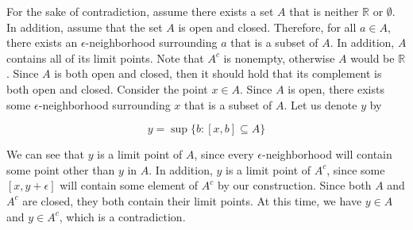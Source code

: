 \documentclass[12pt, letterpaper, twoside]{article}
\begin{document}
For the sake of contradiction, assume there exists a set $A$ that is neither $\mathbb{R}$ or $\emptyset$. In addition, assume that the set $A$ is open and closed. Therefore, for all $a \in A$, there exists an $\epsilon$-neighborhood surrounding $a$ that is a subset of $A$. In addition, $A$ contains all of its limit points. Note that $A^c$ is nonempty, otherwise $A$ would be $\mathbb{R}$. Since $A$ is both open and closed, then it should hold that its complement is both open and closed. Consider the point $x \in A$. Since $A$ is open, there exists some $\epsilon$-neighborhood surrounding $x$ that is a subset of $A$. Let us denote $y$ by 

\begin{equation*}
    y = \sup \{b \colon [x, b] \subseteq A \}
\end{equation*}

We can see that $y$ is a limit point of $A$, since every $\epsilon$-neighborhood will contain some point other than $y$ in $A$. In addition, $y$ is a limit point of $A^c$, since some $[x, y + \epsilon]$ will contain some element of $A^c$ by our construction. Since both $A$ and $A^c$ are closed, they both contain their limit points. At this time, we have $y \in A$ and $y \in A^c$, which is a contradiction. 









    
    
\end{document}
